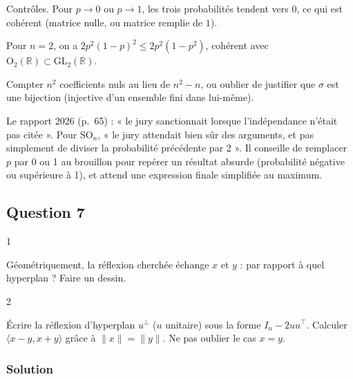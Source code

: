 \documentclass[11pt,a4paper]{article}
\newcommand{\equationajustee}[1]{%
  \sbox{\boiteequation}{$\displaystyle #1$}%
  \ifdim\wd\boiteequation>\linewidth
    \[\resizebox{\linewidth}{!}{\usebox{\boiteequation}}\]%
  \else
    \[#1\]%
  \fi}
\begin{document}
\equationajustee{\boxed{P(Z_n\in{\mathrm{SO}}_n(\mathbb R))=\frac{n!}2\,p^n(1-p)^{n(n-1)}}}

Contrôles. Pour \(p\to0\) ou \(p\to1\), les trois probabilités tendent vers \(0\), ce qui est cohérent (matrice nulle, ou matrice remplie de \(1\)).

Pour \(n=2\), on a \(2p^2(1-p)^2\le2p^2(1-p^2)\), cohérent avec \({\mathrm{O}}_2(\mathbb R)\subset{\mathrm{GL}}_2(\mathbb R)\).

\begin{piege}

Compter \(n^2\) coefficients nuls au lieu de \(n^2-n\), ou oublier de justifier que \(\sigma\) est une bijection (injective d'un ensemble fini dans lui-même).

\end{piege}

\begin{jury}

Le rapport 2026 (p.~65) : « le jury sanctionnait lorsque l'indépendance n'était pas citée ». Pour \({\mathrm{SO}}_n\), « le jury attendait bien sûr des arguments, et pas simplement de diviser la probabilité précédente par 2 ». Il conseille de remplacer \(p\) par 0 ou 1 au brouillon pour repérer un résultat absurde (probabilité négative ou supérieure à 1), et attend une expression finale simplifiée au maximum.

\end{jury}

\hypertarget{question-7}{%
\subsection{Question 7}\label{question-7}}

\begin{indication}{1}

Géométriquement, la réflexion cherchée échange \(x\) et \(y\) : par rapport à quel hyperplan ? Faire un dessin.

\end{indication}

\begin{indication}{2}

Écrire la réflexion d'hyperplan \(u^\perp\) (\(u\) unitaire) sous la forme \(I_n-2uu^\top\). Calculer \(\langle x-y,x+y\rangle\) grâce à \(\|x\|=\|y\|\). Ne pas oublier le cas \(x=y\).

\end{indication}

\hypertarget{solution-6}{%
\subsubsection{Solution}\label{solution-6}}
\end{document}
